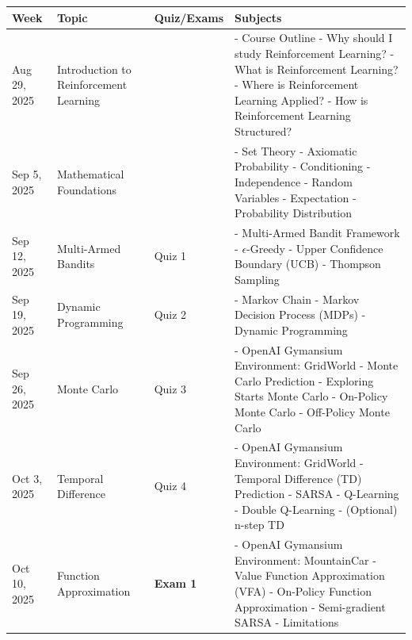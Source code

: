 \documentclass[
  letterpaper,
  DIV=11,
  numbers=noendperiod]{scrreprt}
\begin{document}
\begin{longtable}[]{@{}
  >{\raggedright\arraybackslash}p{}
  >{\raggedright\arraybackslash}p{}
  >{\raggedright\arraybackslash}p{}
  >{\raggedright\arraybackslash}p{}@{}}
\toprule\noalign{}
\begin{minipage}[b]{\linewidth}\raggedright
Week
\end{minipage} & \begin{minipage}[b]{\linewidth}\raggedright
Topic
\end{minipage} & \begin{minipage}[b]{\linewidth}\raggedright
Quiz/Exams
\end{minipage} & \begin{minipage}[b]{\linewidth}\raggedright
Subjects
\end{minipage} \\
\midrule\noalign{}
\endhead
\bottomrule\noalign{}
\endlastfoot
Aug 29, 2025 & Introduction to Reinforcement Learning & & - Course
Outline - Why should I study Reinforcement Learning? - What is
Reinforcement Learning? - Where is Reinforcement Learning Applied? - How
is Reinforcement Learning Structured?  \\
Sep 5, 2025 & Mathematical Foundations & & - Set Theory - Axiomatic
Probability - Conditioning - Independence - Random Variables -
Expectation - Probability Distribution \\
Sep 12, 2025 & Multi-Armed Bandits & Quiz 1 & - Multi-Armed Bandit
Framework - \(\epsilon\)-Greedy - Upper Confidence Boundary (UCB) -
Thompson Sampling \\
Sep 19, 2025 & Dynamic Programming & Quiz 2 & - Markov Chain - Markov
Decision Process (MDPs) - Dynamic Programming \\
Sep 26, 2025 & Monte Carlo & Quiz 3 & - OpenAI Gymansium Environment:
GridWorld - Monte Carlo Prediction - Exploring Starts Monte Carlo -
On-Policy Monte Carlo - Off-Policy Monte Carlo \\
Oct 3, 2025 & Temporal Difference & Quiz 4 & - OpenAI Gymansium
Environment: GridWorld - Temporal Difference (TD) Prediction - SARSA -
Q-Learning - Double Q-Learning - (Optional) n-step TD \\
Oct 10, 2025 & Function Approximation & \textbf{Exam 1} & - OpenAI
Gymansium Environment: MountainCar - Value Function Approximation (VFA)
- On-Policy Function Approximation - Semi-gradient SARSA - Limitations

\end{longtable}
\end{document}
